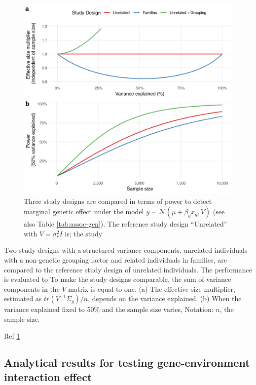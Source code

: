 \documentclass[]{book}
\theoremstyle{definition}
\theoremstyle{definition}
\theoremstyle{definition}
\theoremstyle{remark}
\begin{document}
\begin{figure}

{\centering \includegraphics[width=0.75\linewidth]{figures/07-figure-power-marginal-two-panels} 

}

\caption{Three study designs are compared in terms of power
to detect marginal genetic effect under the model
\(y \sim \mathcal{N}(\mu + \beta_g x_g, V)\) (see also Table
\ref{tab:assoc-gen}). The reference study design ``Unrelated'' with
\(V = \sigma^2_r I\) is; the study}\label{fig:power-marginal}
\end{figure}







Two study designs with a structured variance components, unrelated
individuals with a non-genetic grouping factor and related individuals
in families, are compared to the reference study design of unrelated
individuals. The performance is evaluated to To make the study designs
comparable, the sum of variance components in the \(V\) matrix is equal
to one. (a) The effective size multiplier, estimated as
\(tr(V^{-1} \Sigma_g) / n\), depends on the variance explained. (b) When
the variance explained fixed to 50\% and the sample size varies,
Notation: \(n\), the sample size.

Ref \ref{fig:power-marginal}

\subsection{Analytical results for testing gene-environment interaction
effect}\label{analytical-results-for-testing-gene-environment-interaction-effect}
\end{document}
